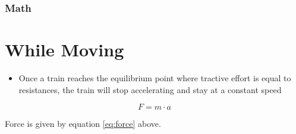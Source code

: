 \documentclass[11pt]{article}
\begin{document}
\subsubsection{Math}
\label{sec:org756d1f8}

\section{While Moving}
\label{sec:org80380d1}
\begin{itemize}
\item Once a train reaches the equilibrium point where tractive effort is
equal to resistances, the train will stop accelerating and stay at a
constant speed
\end{itemize}

\begin{equation}
\label{eq:force}
F = m \cdot a
\end{equation}

Force is given by equation \ref{eq:force} above.
\end{document}
